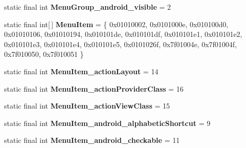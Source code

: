 \begin{DoxyCompactItemize}
\item 
\hypertarget{classandroid_1_1support_1_1v7_1_1appcompat_1_1_r_1_1styleable_af089eb8abf30585bb699a2294320dc62}{}static final int {\bfseries Menu\+Group\+\_\+android\+\_\+visible} = 2\label{classandroid_1_1support_1_1v7_1_1appcompat_1_1_r_1_1styleable_af089eb8abf30585bb699a2294320dc62}

\item 
\hypertarget{classandroid_1_1support_1_1v7_1_1appcompat_1_1_r_1_1styleable_a3161bf75811c963572105d304c98b088}{}static final int\mbox{[}$\,$\mbox{]} {\bfseries Menu\+Item} = \{ 0x01010002, 0x0101000e, 0x010100d0, 0x01010106, 0x01010194, 0x010101de, 0x010101df, 0x010101e1, 0x010101e2, 0x010101e3, 0x010101e4, 0x010101e5, 0x0101026f, 0x7f01004e, 0x7f01004f, 0x7f010050, 0x7f010051 \}\label{classandroid_1_1support_1_1v7_1_1appcompat_1_1_r_1_1styleable_a3161bf75811c963572105d304c98b088}

\item 
\hypertarget{classandroid_1_1support_1_1v7_1_1appcompat_1_1_r_1_1styleable_a38b1a51cd51401648f537d796fb89f16}{}static final int {\bfseries Menu\+Item\+\_\+action\+Layout} = 14\label{classandroid_1_1support_1_1v7_1_1appcompat_1_1_r_1_1styleable_a38b1a51cd51401648f537d796fb89f16}

\item 
\hypertarget{classandroid_1_1support_1_1v7_1_1appcompat_1_1_r_1_1styleable_a2adc6234d0c6d351271313030e3b817d}{}static final int {\bfseries Menu\+Item\+\_\+action\+Provider\+Class} = 16\label{classandroid_1_1support_1_1v7_1_1appcompat_1_1_r_1_1styleable_a2adc6234d0c6d351271313030e3b817d}

\item 
\hypertarget{classandroid_1_1support_1_1v7_1_1appcompat_1_1_r_1_1styleable_a107c702447c8103b6cf1292a3ed39fa1}{}static final int {\bfseries Menu\+Item\+\_\+action\+View\+Class} = 15\label{classandroid_1_1support_1_1v7_1_1appcompat_1_1_r_1_1styleable_a107c702447c8103b6cf1292a3ed39fa1}

\item 
\hypertarget{classandroid_1_1support_1_1v7_1_1appcompat_1_1_r_1_1styleable_a03463ef53f9db3bc022e6ec1a2b4dadb}{}static final int {\bfseries Menu\+Item\+\_\+android\+\_\+alphabetic\+Shortcut} = 9\label{classandroid_1_1support_1_1v7_1_1appcompat_1_1_r_1_1styleable_a03463ef53f9db3bc022e6ec1a2b4dadb}

\item 
\hypertarget{classandroid_1_1support_1_1v7_1_1appcompat_1_1_r_1_1styleable_a466b1e8d87b74e69f6b01a98d43e9d19}{}static final int {\bfseries Menu\+Item\+\_\+android\+\_\+checkable} = 11\label{classandroid_1_1support_1_1v7_1_1appcompat_1_1_r_1_1styleable_a466b1e8d87b74e69f6b01a98d43e9d19}


\end{DoxyCompactItemize}
